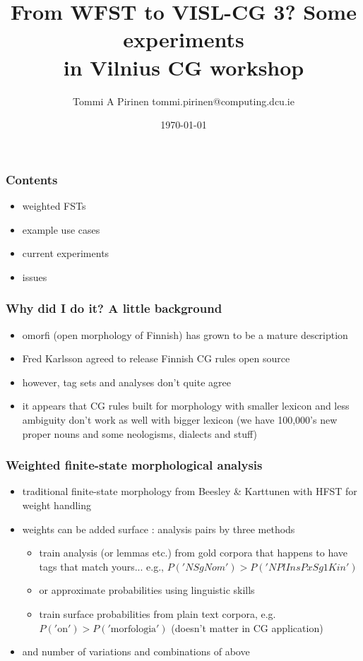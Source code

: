 \documentclass{beamer}
\title{From WFST to VISL-CG 3? Some
    experiments\\
\scriptsize{in Vilnius CG workshop}}
\author{Tommi A Pirinen \scriptsize \guilsinglleft{}tommi.pirinen@computing.dcu.ie\guilsinglright{}}
\institute{Ollscoil Chathair Bhaile Átha Cliath, ADAPT Centre\\
EU Marie Curie Abu-MaTran project}
\date{\today}
\begin{document}

\maketitle

\begin{frame}
    \frametitle{Contents}
    \begin{itemize}
        \item weighted FSTs
        \item example use cases
        \item current experiments
        \item issues
    \end{itemize}
\end{frame}

\begin{frame}
    \frametitle{Why did I do it? A little background}
    \begin{itemize}
        \item omorfi (open morphology of Finnish) has grown to be a mature
            description
        \item Fred Karlsson agreed to release Finnish CG rules open source
        \item however, tag sets and analyses don't quite agree
        \item it appears that CG rules built for morphology with smaller
            lexicon and less ambiguity don't work as well with bigger lexicon
            (we have 100,000's new proper nouns and some neologisms, dialects
            and stuff)
    \end{itemize}
\end{frame}


\begin{frame}
    \frametitle{Weighted finite-state morphological analysis}
    \begin{itemize}
        \item traditional finite-state morphology from Beesley \& Karttunen
            with HFST for weight handling
        \item weights can be added surface : analysis pairs by three methods
        \begin{itemize}
            \item train analysis (or lemmas etc.)
            from gold corpora that happens to have tags
            that match yours... e.g., $P('N Sg Nom') > P('N Pl Ins PxSg1 Kin')$
            \item or approximate probabilities using linguistic skills
            \item train surface probabilities from plain text corpora, e.g. 
            $P('\mathrm{on}') > P('\mathrm{morfologia}')$ (doesn't matter in
            CG application)
        \end{itemize}
        \item and number of variations and combinations of above
    \end{itemize}
\end{frame}
\end{document}
